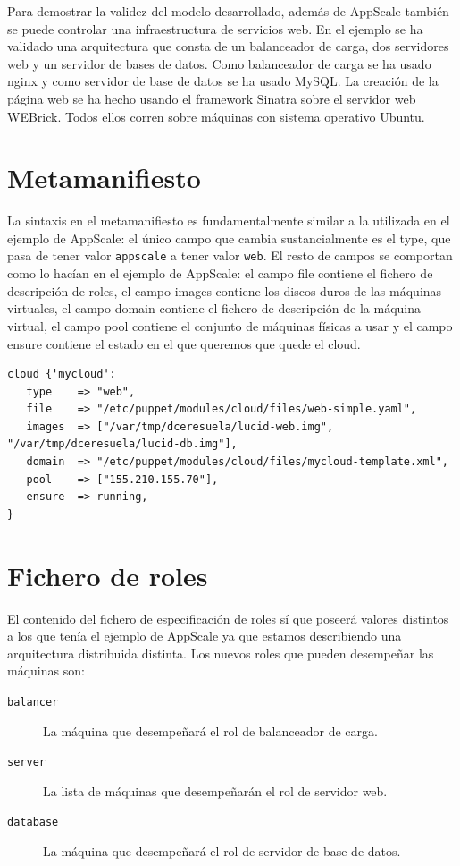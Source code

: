 Para demostrar la validez del modelo desarrollado, además de AppScale también se puede controlar una infraestructura de servicios web. En el ejemplo se ha validado una arquitectura que consta de un balanceador de carga, dos servidores web y un servidor de bases de datos. Como balanceador de carga se ha usado nginx y como servidor de base de datos se ha usado MySQL. La creación de la página web se ha hecho usando el framework Sinatra sobre el servidor web WEBrick. Todos ellos corren sobre máquinas con sistema operativo Ubuntu.\\

\section{Metamanifiesto}

La sintaxis en el metamanifiesto es fundamentalmente similar a la utilizada en el ejemplo de AppScale: el único campo que cambia sustancialmente es el type, que pasa de tener valor \texttt{appscale} a tener valor \texttt{web}. El resto de campos se comportan como lo hacían en el ejemplo de AppScale: el campo file contiene el fichero de descripción de roles, el campo images contiene los discos duros de las máquinas virtuales, el campo domain contiene el fichero de descripción de la máquina virtual, el campo pool contiene el conjunto de máquinas físicas a usar y el campo ensure contiene el estado en el que queremos que quede el cloud.

\begin{lstlisting}
cloud {'mycloud':
   type    => "web",
   file    => "/etc/puppet/modules/cloud/files/web-simple.yaml",
   images  => ["/var/tmp/dceresuela/lucid-web.img", "/var/tmp/dceresuela/lucid-db.img"],
   domain  => "/etc/puppet/modules/cloud/files/mycloud-template.xml",
   pool    => ["155.210.155.70"],
   ensure  => running,
}
\end{lstlisting}

\section{Fichero de roles}

El contenido del fichero de especificación de roles sí que poseerá valores distintos a los que tenía el ejemplo de AppScale ya que estamos describiendo una arquitectura distribuida distinta. Los nuevos roles que pueden desempeñar las máquinas son:
\begin{description}
\item[\texttt{balancer}] La máquina que desempeñará el rol de balanceador de carga.
\item[\texttt{server}] La lista de máquinas que desempeñarán el rol de servidor web.
\item[\texttt{database}] La máquina que desempeñará el rol de servidor de base de datos.
\end{description}

